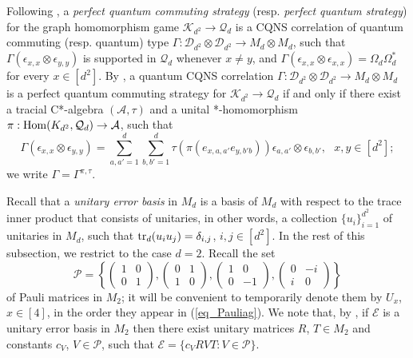 \documentclass[11pt]{amsart}
\theoremstyle{definition}
\newcommand{\cl}[1]{\mathcal{#1}}
\begin{document}
Following \cite{tt-QNS}, a \emph{perfect quantum commuting strategy} 
(resp. \emph{perfect quantum strategy})
for the 
graph homomorphism game $\cl K_{d^2}\rightarrow \cl Q_d$ 
is a CQNS correlation of quantum commuting (resp.  quantum) type
$\Gamma : \cl D_{d^2} \otimes \cl D_{d^2}\to M_d\otimes M_d$, such that 
$\Gamma(\epsilon_{x,x}\otimes \epsilon_{y,y})$ is supported in 
$\cl Q_d$ whenever $x\neq y$, and 
$\Gamma(\epsilon_{x,x}\otimes \epsilon_{x,x}) = \Omega_d\Omega_d^*$ for every 
$x\in [d^2]$. 
By \cite{bhtt-JFA, tt-QNS}, a quantum CQNS correlation 
$\Gamma : \cl D_{d^2} \otimes \cl D_{d^2}\to M_d\otimes M_d$ 
is a perfect quantum commuting strategy for $\cl K_{d^2}\rightarrow \cl Q_d$ 
if and only if there exist a 
tracial  C*-algebra  $(\cl A, \tau)$ 
and a unital *-homomorphism 
$\pi: {\rm Hom}(K_{d^2}, \cl Q_d)\to \cl A$, such that 
$$\Gamma(\epsilon_{x,x}\otimes\epsilon_{y,y}) 
= \sum_{a,a'=1}^d \sum_{b,b'=1}^d \tau(\pi(e_{x,a,a'}e_{y,b'b}))\epsilon_{a,a'}\otimes\epsilon_{b,b'}, 
\ \ \ x,y\in [d^2];$$
we write $\Gamma = \Gamma^{\pi,\tau}$.

Recall that a \emph{unitary error basis} in $M_d$ 
is a basis of $M_d$ with respect to the trace inner product that consists of 
unitaries, in other words, a collection $\{u_i\}_{i=1}^{d^2}$ of unitaries in $M_d$, such that 
${\rm tr}_d(u_i u_j) = \delta_{i,j}$, $i,j\in [d^2]$. 
In the rest of this subsection, we restrict to the case $d = 2$. 
Recall the set 
\begin{equation}\label{eq_Pauliag}
\cl P=\left\{\left(\begin{array}{cc} 1&0\\0&1\end{array}\right), \left(\begin{array}{cc} 0&1\\1&0\end{array}\right), \left(\begin{array}{cc} 1&0\\0&-1\end{array}\right), \left(\begin{array}{cc} 0&-i\\i&0\end{array}\right)\right\}
\end{equation}
of Pauli matrices in $M_2$; 
it will be convenient to temporarily denote them by  
$U_x$, $x\in[4]$, in the order they appear in (\ref{eq_Pauliag}). 
We note that, by \cite{kr}, 
if $\cl E$ is a unitary error basis in $M_2$ then
there exist unitary matrices $R$, $T\in M_2$ and constants $c_V$, $V\in \cl P$, such that
$\cl E = \{c_VRVT: V\in\cl P\}$.
\end{document}
